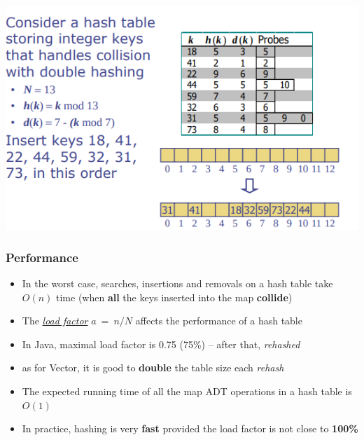 \documentclass{article}
\newcommand{\worddef}[1]{\hyperref[sec:reference]{\textit{#1}}}
\begin{document}
\begin{center}
	\includegraphics[scale=0.4]{double_hashing.png}
\end{center}

\subsubsection{Performance}
\begin{itemize}
	\item In the worst case, searches, insertions and removals on a hash table take $O(n)$ time (when \textbf{all} the keys inserted into the map \textbf{collide})
	\item The \worddef{load factor} $a \: = \: n/N$ affects the performance of a hash table
	\item In Java, maximal load factor is 0.75 (75\%) – after that, \textit{rehashed}
	\item as for Vector, it is good to \textbf{double} the table size each \textit{rehash} 
	\item The expected running time of all the map ADT operations in a hash table is $O(1)$
	\item In practice, hashing is very \textbf{fast} provided the load factor is not close to \textbf{100\%}
\end{itemize}
\end{document}
